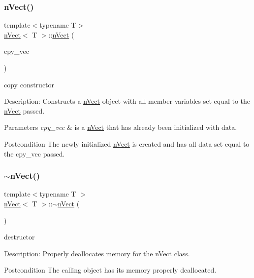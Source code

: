 \subsubsection{\texorpdfstring{n\+Vect()}{nVect()}\hspace{0.1cm}{\footnotesize\ttfamily [4/4]}}
{\footnotesize\ttfamily template$<$typename T$>$ \\
\hyperlink{classnVect}{n\+Vect}$<$ T $>$\+::\hyperlink{classnVect}{n\+Vect} (\begin{DoxyParamCaption}\item[{const \hyperlink{classnVect}{n\+Vect}$<$ T $>$ \&}]{cpy\+\_\+vec }\end{DoxyParamCaption})}



copy constructor 

Description\+: Constructs a \hyperlink{classnVect}{n\+Vect} object with all member variables set equal to the \hyperlink{classnVect}{n\+Vect} passed. 
\begin{DoxyParams}{Parameters}
{\em cpy\+\_\+vec} & is a \hyperlink{classnVect}{n\+Vect} that has already been initialized with data. \\
\hline
\end{DoxyParams}
\begin{DoxyPostcond}{Postcondition}
The newly initialized \hyperlink{classnVect}{n\+Vect} is created and has all data set equal to the cpy\+\_\+vec passed. 
\end{DoxyPostcond}
\mbox{\label{classnVect_a7d537e5be0ce55f3ea40e43c54cdb9a7}} 
\subsubsection{\texorpdfstring{$\sim$n\+Vect()}{~nVect()}}
{\footnotesize\ttfamily template$<$typename T $>$ \\
\hyperlink{classnVect}{n\+Vect}$<$ T $>$\+::$\sim$\hyperlink{classnVect}{n\+Vect} (\begin{DoxyParamCaption}{ }\end{DoxyParamCaption})}



destructor 

Description\+: Properly deallocates memory for the \hyperlink{classnVect}{n\+Vect} class. \begin{DoxyPostcond}{Postcondition}
The calling object has its memory properly deallocated. 
\end{DoxyPostcond}


